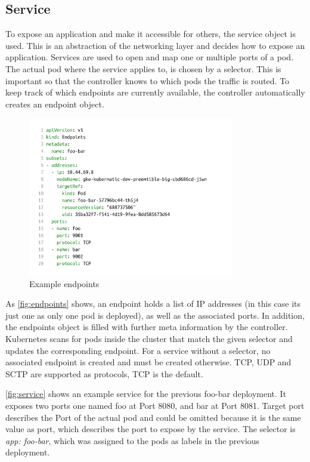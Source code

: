 \subsection{Service}\label{subsec:service}
To expose an application and make it accessible for others, the service object is used.
This is an abstraction of the networking layer and decides how to expose an application.
Services are used to open and map one or multiple ports of a pod.
The actual pod where the service applies to, is chosen by a selector.
This is important so that the controller knows to which pods the traffic is routed.
To keep track of which endpoints are currently available, the controller automatically creates an endpoint object.

\begin{figure}[H]
    \centering
    \includegraphics[width=0.8\textwidth, left]{media/02/endpoint}
    \caption{Example endpoints}
    \label{fig:endpoints}
\end{figure}

As \autoref{fig:endpoints} shows, an endpoint holds a list of IP addresses (in this case its just one as only one pod is deployed), as well as the associated ports.
In addition, the endpoints object is filled with further meta information by the controller.
Kubernetes scans for pods inside the cluster that match the given selector and updates the corresponding endpoint.
For a service without a selector, no associated endpoint is created and must be created otherwise.
TCP, UDP and SCTP are supported as protocols, TCP is the default.

\autoref{fig:service} shows an example service for the previous foo-bar deployment.
It exposes two ports one named foo at Port 8080, and bar at Port 8081.
Target port describes the Port of the actual pod and could be omitted because it is the same value as port, which describes the port to expose by the service.
The selector is \textit{app: foo-bar}, which was assigned to the pods as labels in the previous deployment.


